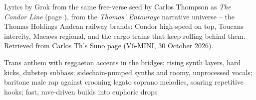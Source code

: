 
\label{sec:condor-rising}
\begin{notes}
Lyrics by Grok from the same free-verse seed by Carlos Thompson as \emph{The Condor Line} (page \pageref{sec:the-condor-line}), from the \emph{Thomas' Entourage} narrative universe -- the Thomas Holdings Andean railway brands: Condor high-speed on top, Toucans intercity, Macaws regional, and the cargo trains that keep rolling behind them. Retrieved from Carlos Th's Suno page (V6-MINI, 30 October 2026).
\end{notes}
\begin{style}
Trans anthem with reggaeton accents in the bridges; rising synth layers, hard kicks, dubstep subbass; sidechain-pumped synths and roomy, unprocessed vocals; baritone male rap against crooning legato soprano melodies, soaring repetitive hooks; fast, rave-driven builds into euphoric drops
\end{style}
